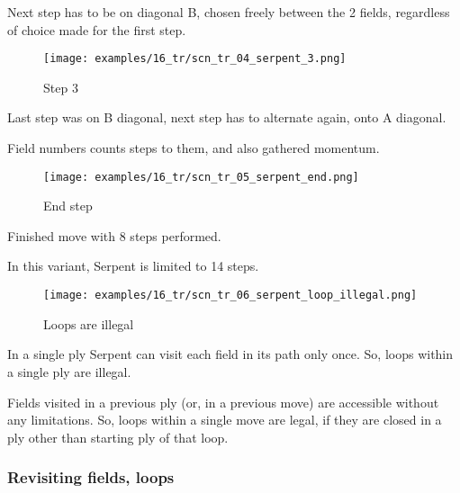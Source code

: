 Next step has to be on diagonal B, chosen freely between the 2 fields,
regardless of choice made for the first step.

\clearpage %

\vspace*{-1.2\baselineskip}
\noindent
\begin{wrapfigure}[6]{l}{0.4\textwidth}
\centering
\texttt{[image: examples/16\_tr/scn\_tr\_04\_serpent\_3.png]}
\vspace*{-0.5\baselineskip}
\caption{Step 3}
\label{fig:scn_tr_04_serpent_3}
\end{wrapfigure}
Last step was on B diagonal, next step has to alternate again, onto A diagonal.

Field numbers counts steps to them, and also gathered momentum.

\vspace*{2.7\baselineskip}
\noindent
\begin{wrapfigure}[4]{l}{0.4\textwidth}
\centering
\texttt{[image: examples/16\_tr/scn\_tr\_05\_serpent\_end.png]}
\vspace*{-0.5\baselineskip}
\caption{End step}
\label{fig:scn_tr_05_serpent_end}
\end{wrapfigure}
Finished move with 8 steps performed.

In this variant, Serpent is limited to 14 steps.

\vspace*{4.7\baselineskip}
\noindent
\begin{wrapfigure}[9]{l}{0.4\textwidth}
\centering
\texttt{[image: examples/16\_tr/scn\_tr\_06\_serpent\_loop\_illegal.png]}
\vspace*{-0.5\baselineskip}
\caption{Loops are illegal}
\label{fig:scn_tr_06_serpent_loop_illegal}
\end{wrapfigure}
In a single ply Serpent can visit each field in its path only once.
So, loops within a single ply are illegal.

Fields visited in a previous ply (or, in a previous move) are accessible
without any limitations. So, loops within a single move are legal, if they
are closed in a ply other than starting ply of that loop.

\clearpage %

\subsubsection*{Revisiting fields, loops}
\label{sec:Tamoanchan Revisited/Serpent/Movement/Revisiting fields, loops}

